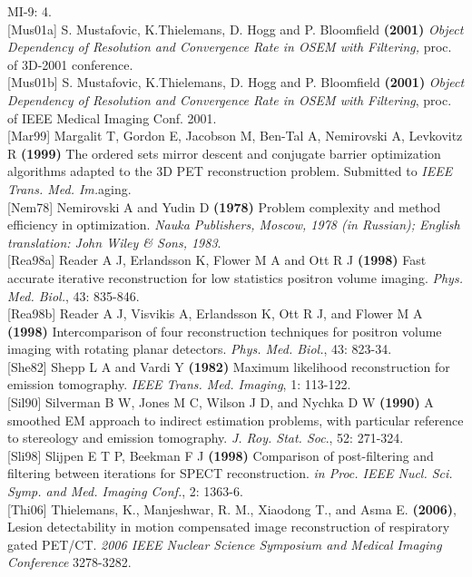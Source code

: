 \documentclass{article}
\begin{document}
MI-9: 4.\\
{[}Mus01a{]} S. Mustafovic, K.Thielemans, D. Hogg and P. Bloomfield \textbf{(2001)} 
\textit{Object Dependency of Resolution and Convergence Rate in OSEM 
with Filtering,} proc. of 3D-2001 conference.\\
{[}Mus01b{]} S. Mustafovic, K.Thielemans, D. Hogg and P. Bloomfield \textbf{(2001)} \textit{Object 
Dependency of Resolution and Convergence Rate in OSEM with Filtering}, 
proc. of IEEE Medical Imaging Conf. 2001.\\
{[}Mar99{]} Margalit T, Gordon E, Jacobson M, Ben-Tal A, Nemirovski 
A, Levkovitz R \textbf{(1999)} The ordered sets mirror descent and 
conjugate barrier optimization algorithms adapted to the 3D PET 
reconstruction problem. Submitted to \textit{IEEE Trans. Med. Im.}aging.\\
{[}Nem78{]} Nemirovski A and Yudin D \textbf{(1978)} Problem complexity 
and method efficiency in optimization. \textit{Nauka Publishers, 
Moscow, 1978 (in Russian); English translation: John Wiley \& 
Sons, 1983}.\\
{[}Rea98a{]} Reader A J, Erlandsson K, Flower M A and Ott R J \textbf{(1998)} 
Fast accurate iterative reconstruction for low statistics positron 
volume imaging. \textit{Phys. Med. Biol.}, 43: 835-846.\\
{[}Rea98b{]} Reader A J, Visvikis A, Erlandsson K, Ott R J, and Flower 
M A \textbf{(1998)} Intercomparison of four reconstruction techniques 
for positron volume imaging with rotating planar detectors. \textit{Phys. 
Med. Biol.}, 43: 823-34.\\
{[}She82{]} Shepp L A and Vardi Y \textbf{(1982)} Maximum likelihood reconstruction 
for emission tomography. \textit{IEEE Trans. Med. Imaging}, 1: 113-122.\\
{[}Sil90{]} Silverman B W, Jones M C, Wilson J D, and Nychka D W \textbf{(1990)} 
A smoothed EM approach to indirect estimation problems, with 
particular reference to stereology and emission tomography. \textit{J. 
Roy. Stat. Soc}., 52: 271-324.\\
{[}Sli98{]} Slijpen E T P, Beekman F J \textbf{(1998)} Comparison of post-filtering 
and filtering between iterations for SPECT reconstruction. \textit{in 
Proc. IEEE Nucl. Sci. Symp. and Med. Imaging Conf.}, 2: 1363-6.\\
{[}Thi06{]} Thielemans, K., Manjeshwar, R. M., Xiaodong T., and Asma E.
\textbf{(2006)}, Lesion detectability in motion compensated
image reconstruction of respiratory gated PET/CT. \textit { 2006 IEEE
Nuclear Science Symposium and Medical Imaging Conference} 3278-3282.
\end{document}
